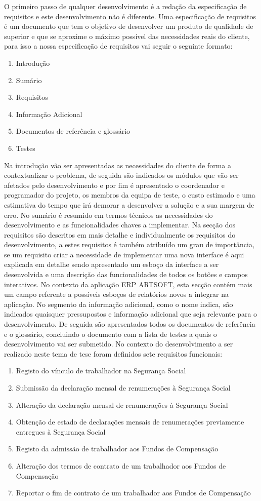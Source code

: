 \documentclass[sigplan]{acmart}
\begin{document}
O primeiro passo de qualquer desenvolvimento é a redação da especificação de requisitos e este desenvolvimento não é diferente. Uma especificação de requisitos é um documento que tem o objetivo de desenvolver um produto de qualidade de superior e que se aproxime o máximo possível das necessidades reais do cliente, para isso a nossa especificação de requisitos vai seguir o seguinte formato:
\begin{enumerate}
  \item Introdução
  \item Sumário
  \item Requisitos
  \item Informação Adicional
  \item Documentos de referência e glossário
  \item Testes
\end{enumerate}
Na introdução vão ser apresentadas as necessidades do cliente de forma a contextualizar o problema, de seguida são indicados os módulos que vão ser afetados pelo desenvolvimento e por fim é apresentado o coordenador e programador do projeto, os membros da equipa de teste, o custo estimado e uma estimativa do tempo que irá demorar a desenvolver a solução e a sua margem de erro. No sumário é resumido em termos técnicos as necessidades do desenvolvimento e as funcionalidades chaves a implementar. Na secção dos requisitos são descritos em mais detalhe e individualmente os requisitos do desenvolvimento, a estes requisitos é também atribuído um grau de importância, se um requisito criar a necessidade de implementar uma nova interface é aqui explicada em detalhe sendo apresentado um esboço da interface a ser desenvolvida e uma descrição das funcionalidades de todos os botões e campos interativos. No contexto da aplicação ERP ARTSOFT, esta secção contém mais um campo referente a possíveis esboços de relatórios novos a integrar na aplicação. No segmento da informação adicional, como o nome indica, são indicados quaisquer pressupostos e informação adicional que seja relevante para o desenvolvimento. De seguida são apresentados todos os documentos de referência e o glossário, concluindo o documento com a lista de testes a quais o desenvolvimento vai ser submetido. No contexto do desenvolvimento a ser realizado neste tema de tese foram definidos sete requisitos funcionais:
\begin{enumerate}
  \item Registo do vínculo de trabalhador na Segurança Social
  \item Submissão da declaração mensal de renumerações à Segurança Social
  \item Alteração da declaração mensal de renumerações à Segurança Social
  \item Obtenção de estado de declarações mensais de renumerações previamente entregues à Segurança Social
  \item Registo da admissão de trabalhador aos Fundos de Compensação
  \item Alteração dos termos de contrato de um trabalhador aos Fundos de Compensação
  \item Reportar o fim de contrato de um trabalhador aos Fundos de Compensação
\end{enumerate}
\end{document}
